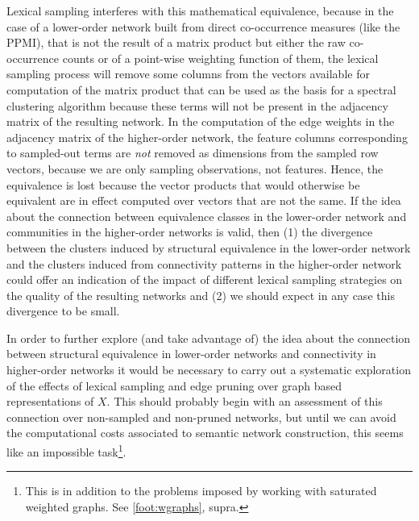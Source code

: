 Lexical sampling interferes with this mathematical equivalence, because in the case of a lower-order network built from direct co-occurrence measures (like the PPMI), that is not the result of a matrix product but either the raw co-occurrence counts or of a point-wise weighting function of them, the lexical sampling process will remove some columns from the vectors available for computation of the matrix product that can be used as the basis for a spectral clustering algorithm because these terms will not be present in the adjacency matrix of the resulting network.
In the computation of the edge weights in the adjacency matrix of the higher-order network, the feature columns corresponding to sampled-out terms are \emph{not} removed as dimensions from the sampled row vectors, because we are only sampling observations, not features.
Hence, the equivalence is lost because the vector products that would otherwise be equivalent are in effect computed over vectors that are not the same.
If the idea about the connection between equivalence classes in the lower-order network and communities in the higher-order networks is valid, then (1) the divergence between the clusters induced by structural equivalence in the lower-order network and the clusters induced from connectivity patterns in the higher-order network could offer an indication of the impact of different lexical sampling strategies on the quality of the resulting networks and (2) we should expect in any case this divergence to be small.

In order to further explore (and take advantage of) the idea about the connection between structural equivalence in lower-order networks and connectivity in higher-order networks it would be necessary to carry out a systematic exploration of the effects of lexical sampling and edge pruning over graph based representations of $X$.
This should probably begin with an assessment of this connection over non-sampled and non-pruned networks, but until we can avoid the computational costs associated to semantic network construction, this seems like an impossible task\footnote{
    This is in addition to the problems imposed by working with saturated weighted graphs.
    See \autoref{foot:wgraphs}, supra.
}.


